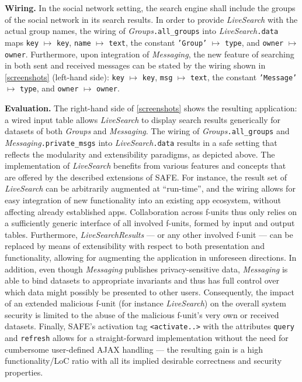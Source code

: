 \documentclass{src/acm_proc_article-sp} \else
\newcommand\myparagraph[1]{\medskip\noindent\textbf{#1.}}
\newcommand\SAFE{SAFE\xspace}
\begin{document}
\myparagraph{Wiring}
In the social network setting, the search engine shall include the
groups of the social network in its search results. In order to
provide \emph{LiveSearch} with the actual group names, the wiring of
\emph{Groups}\texttt{.all\_groups} into
\emph{LiveSearch}\texttt{.data} maps \texttt{key} $\mapsto$
\texttt{key}, \texttt{name} $\mapsto$ \texttt{text}, the constant
\texttt{'Group'} $\mapsto$ \texttt{type}, and \texttt{owner}
$\mapsto$ \texttt{owner}. Furthermore, upon integration of
\emph{Messaging}, the new feature of searching in both sent and
received messages can be stated by the wiring shown in
\autoref{screenshots} (left-hand side): \texttt{key} $\mapsto$
\texttt{key}, \texttt{msg} $\mapsto$ \texttt{text}, the constant
\texttt{'Message'} $\mapsto$ \texttt{type}, and \texttt{owner}
$\mapsto$ \texttt{owner}.



\myparagraph{Evaluation}
The right-hand side of \autoref{screenshots} shows the resulting application: a
wired input table allows \emph{LiveSearch} to display search results
generically for datasets of both \emph{Groups} and \emph{Messaging}.
The wiring of \emph{Groups}\texttt{\!.\!all\_groups} and
\emph{Messaging}\texttt{\!.\!private\_msgs} into
\emph{LiveSearch}\texttt{.data} results in a safe setting that
reflects the modularity and extensibility par\-a\-digms, as depicted
above.
The implementation of \emph{LiveSearch} benefits from various
features and concepts that are offered by the described extensions of
\SAFE.
For instance, the result set of \emph{LiveSearch} can be arbitrarily
augmented at ``run-time'', and the wiring allows for easy integration
of new functionality into an existing app ecosystem, without
affecting already established apps. Collaboration across f-units thus
only relies on a sufficiently generic interface of all involved
f-units, formed by input and output tables.
Furthermore, \emph{LiveSearchResults} --- or any other involved
f-unit --- can be replaced by means of extensibility with respect to
both presentation and functionality, allowing for augmenting the
application in unforeseen directions.
In addition, even though \emph{Messaging} publishes
privacy-sen\-si\-tive data, \emph{Messaging} is able to bind datasets
to appropriate invariants and thus has full control over which data
might possibly be presented to other users. Consequently, the impact
of an extended malicious f-unit (for instance \emph{LiveSearch}) on
the overall system security is limited to the abuse of the malicious
f-unit's very own or received datasets.
Finally, \SAFE's activation tag \texttt{<activate..>} with the
attributes \texttt{query} and \texttt{refresh} allows for a
straight-forward implementation without the need for cumbersome
user-defined AJAX handling --- the resulting gain is a high
functionality/LoC ratio with all its implied desirable correctness
and security properties.
\end{document}
